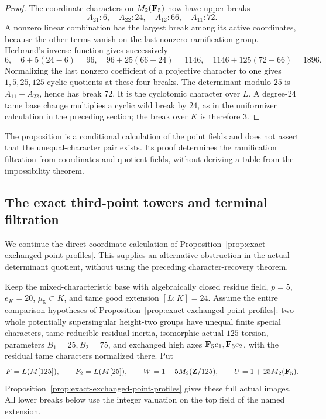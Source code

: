 \begin{proof}
The coordinate characters on $M_2(\mathbf F_5)$ now have upper breaks
\[
                    A_{21}:6,\quad A_{22}:24,\quad
                    A_{12}:66,\quad A_{11}:72.
\]
A nonzero linear combination has the largest break among its active coordinates, because the other terms vanish on the last nonzero ramification group. Herbrand's inverse function gives successively
\[
 6,\quad6+5(24-6)=96,\quad96+25(66-24)=1146,
 \quad1146+125(72-66)=1896.
\]
Normalizing the last nonzero coefficient of a projective character to one gives $1,5,25,125$ cyclic quotients at these four breaks. The determinant modulo $25$ is $A_{11}+A_{22}$, hence has break $72$. It is the cyclotomic character over $L$. A degree-$24$ tame base change multiplies a cyclic wild break by $24$, as in the uniformizer calculation in the preceding section; the break over $K$ is therefore $3$.
\end{proof}

The proposition is a conditional calculation of the point fields and does not assert that the unequal-character pair exists. Its proof determines the ramification filtration from coordinates and quotient fields, without deriving a table from the impossibility theorem.

\subsection{The exact third-point towers and terminal filtration}
We continue the direct coordinate calculation of Proposition~\ref{prop:exact-exchanged-point-profiles}. This supplies an alternative obstruction in the actual determinant quotient, without using the preceding character-recovery theorem.

Keep the mixed-characteristic base with algebraically closed residue field, $p=5$, $e_K=20$, $\mu_5\subset K$, and tame good extension $[L:K]=24$. Assume the entire comparison hypotheses of Proposition~\ref{prop:exact-exchanged-point-profiles}: two whole potentially supersingular height-two groups have unequal finite special characters, tame reducible residual inertia, isomorphic actual $125$-torsion, parameters $B_1=25,B_2=75$, and exchanged high axes $\mathbf F_5e_1,\mathbf F_5e_2$, with the residual tame characters normalized there. Put
\[
 F=L(M[125]),\qquad F_2=L(M[25]),\qquad
 W=1+5M_2(\mathbf Z/125),\qquad U=1+25M_2(\mathbf F_5).
\]
Proposition~\ref{prop:exact-exchanged-point-profiles} gives these full actual images. All lower breaks below use the integer valuation on the top field of the named extension.

